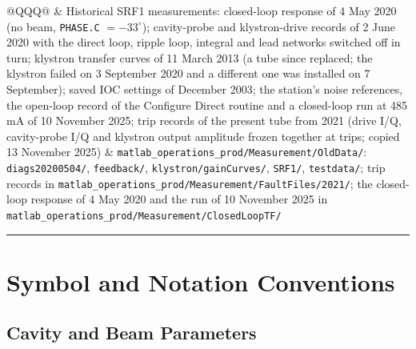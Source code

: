\begin{longtable*}[]{@{}Q{\tabcolsep\relax}Q{\tabcolsep\relax}Q{\tabcolsep\relax}@{}}
 & Historical SRF1 measurements: closed-loop response of 4 May 2020 (no beam, \texttt{PHASE.C} \(= -33^\circ\)); cavity-probe and klystron-drive records of 2 June 2020 with the direct loop, ripple loop, integral and lead networks switched off in turn; klystron transfer curves of 11 March 2013 (a tube since replaced; the klystron failed on 3 September 2020 and a different one was installed on 7 September); saved IOC settings of December 2003; the station's noise references, the open-loop record of the Configure Direct routine and a closed-loop run at 485 mA of 10 November 2025; trip records of the present tube from 2021 (drive I/Q, cavity-probe I/Q and klystron output amplitude frozen together at trips; copied 13 November 2025) & \texttt{matlab\_\allowbreak{}operations\_\allowbreak{}prod/\allowbreak{}Measurement/\allowbreak{}OldData/}: \texttt{diags20200504/}, \texttt{feedback/}, \texttt{klystron/\allowbreak{}gainCurves/}, \texttt{SRF1/}, \texttt{testdata/}; trip records in \texttt{matlab\_\allowbreak{}operations\_\allowbreak{}prod/\allowbreak{}Measurement/\allowbreak{}FaultFiles/\allowbreak{}2021/}; the closed-loop response of 4 May 2020 and the run of 10 November 2025 in \texttt{matlab\_\allowbreak{}operations\_\allowbreak{}prod/\allowbreak{}Measurement/\allowbreak{}ClosedLoopTF/} \\
\end{longtable*}

\begin{center}\rule{0.5\linewidth}{0.5pt}\end{center}

\section{Symbol and Notation Conventions}\label{app:symbols}


\subsection{Cavity and Beam Parameters}\label{sec:c1-symbols}


